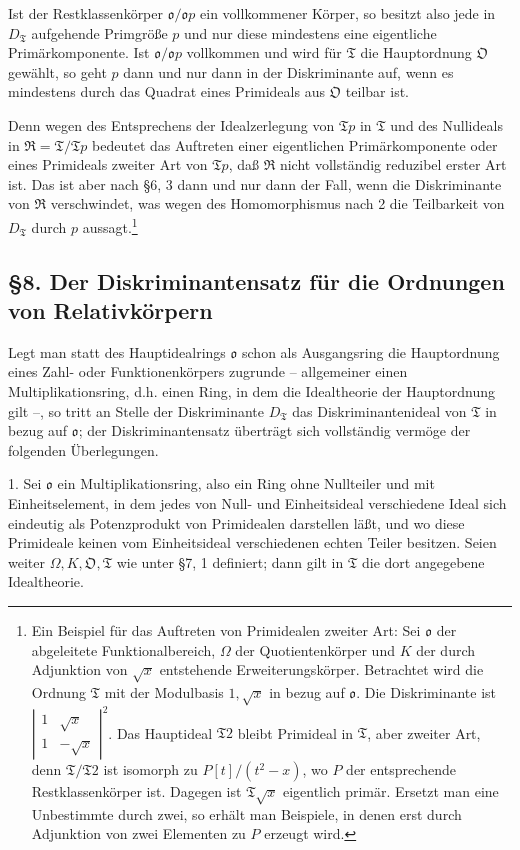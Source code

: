 \documentclass[11pt]{article}
\providecommand{\mR}{\mathfrak{R}}
\providecommand{\mT}{\mathfrak{T}}
\providecommand{\mO}{\mathfrak{O}}
\providecommand{\mo}{\mathfrak{o}}
\begin{document}
Ist der Restklassenkörper $\mo/\mo p$ ein vollkommener Körper, so besitzt also jede in $D_\mT$ aufgehende Primgröße $p$ und nur diese mindestens eine eigentliche Primärkomponente. Ist $\mo/\mo p$ vollkommen und wird für $\mT$ die Hauptordnung $\mO$ gewählt, so geht $p$ dann und nur dann in der Diskriminante auf, wenn es mindestens durch das Quadrat eines Primideals aus $\mO$ teilbar ist.

Denn wegen des Entsprechens der Idealzerlegung von $\mT p$ in $\mT$ und des Nullideals in $\mR=\mT/\mT p$ bedeutet das Auftreten einer eigentlichen Primärkomponente oder eines Primideals zweiter Art von $\mT p$, daß $\mR$ nicht vollständig reduzibel erster Art ist. Das ist aber nach §6, 3 dann und nur dann der Fall, wenn die Diskriminante von $\mR$ verschwindet, was wegen des Homomorphismus nach 2 die Teilbarkeit von $D_\mT$ durch $p$ aussagt.\footnote{Ein Beispiel für das Auftreten von Primidealen zweiter Art: Sei $\mo$ der abgeleitete Funktionalbereich, $\Omega$ der Quotientenkörper und $K$ der durch Adjunktion von $\sqrt{x}$ entstehende Erweiterungskörper. Betrachtet wird die Ordnung $\mT$ mit der Modulbasis $1,\sqrt{x}$ in bezug auf $\mo$. Die Diskriminante ist $\left|\begin{smallmatrix}1&\sqrt{x}\\1&-\sqrt{x}\end{smallmatrix}\right|^2$. Das Hauptideal $\mT2$ bleibt Primideal in $\mT$, aber zweiter Art, denn $\mT/\mT2$ ist isomorph zu $P[t]/(t^2-x)$, wo $P$ der entsprechende Restklassenkörper ist. Dagegen ist $\mT\sqrt{x}$ eigentlich primär. Ersetzt man eine Unbestimmte durch zwei, so erhält man Beispiele, in denen erst durch Adjunktion von zwei Elementen zu $P$ erzeugt wird.}

\subsection*{§8. Der Diskriminantensatz für die Ordnungen von Relativkörpern}

Legt man statt des Hauptidealrings $\mo$ schon als Ausgangsring die Hauptordnung eines Zahl- oder Funktionenkörpers zugrunde -- allgemeiner einen Multiplikationsring, d.h. einen Ring, in dem die Idealtheorie der Hauptordnung gilt --, so tritt an Stelle der Diskriminante $D_\mT$ das Diskriminantenideal von $\mT$ in bezug auf $\mo$; der Diskriminantensatz überträgt sich vollständig vermöge der folgenden Überlegungen.

1. Sei $\mo$ ein Multiplikationsring, also ein Ring ohne Nullteiler und mit Einheitselement, in dem jedes von Null- und Einheitsideal verschiedene Ideal sich eindeutig als Potenzprodukt von Primidealen darstellen läßt, und wo diese Primideale keinen vom Einheitsideal verschiedenen echten Teiler besitzen. Seien weiter $\Omega,K,\mO,\mT$ wie unter §7, 1 definiert; dann gilt in $\mT$ die dort angegebene Idealtheorie.
\end{document}
